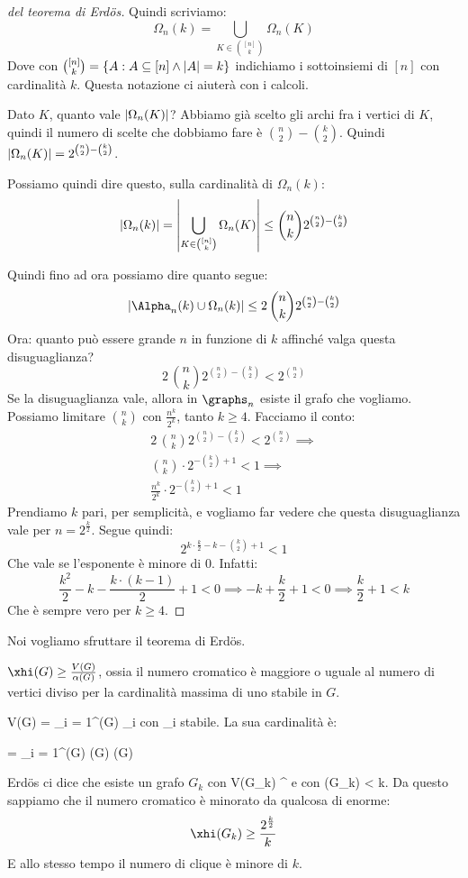 \begin{proof}[del teorema di Erd\"os]
	Quindi scriviamo:
	\[
		\Omega_n (k) = \bigcup_{K \in \binom{[n]}{k}} \Omega_n (K)
	\]
	Dove con $\binom{[n]}{k} = \{ A : A \subseteq [n] \land \left\lvert{A}\right\rvert = k \}$ indichiamo i sottoinsiemi di $[n]$ con cardinalit\`a $k$.
	Questa notazione ci aiuter\`a con i calcoli.

	Dato $K$, quanto vale $\left\lvert{\Omega_n (K)}\right\rvert$?
	Abbiamo gi\`a scelto gli archi fra i vertici di $K$, quindi il numero di scelte che dobbiamo fare \`e $\binom{n}{2} - \binom{k}{2}$.
	Quindi $\left\lvert{\Omega_n (K)}\right\rvert = 2^{\binom{n}{2} - \binom{k}{2}}$.

	Possiamo quindi dire questo, sulla cardinalit\`a di $\Omega_n (k)$:
	\[
		\left\lvert{\Omega_n (k)}\right\rvert = \left\lvert{\bigcup_{K \in \binom{[n]}{k}} \Omega_n (K)}\right\rvert \le
		\binom{n}{k} 2^{\binom{n}{2} - \binom{k}{2}}
	\]

	Quindi fino ad ora possiamo dire quanto segue:
	\[
		\abs{\Alpha_n (k) \cup \Omega_n (k)} \le 2 \, \binom{n}{k} 2^{\binom{n}{2} - \binom{k}{2}}
	\]
	Ora: quanto pu\`o essere grande $n$ in funzione di $k$ affinch\'e valga questa disuguaglianza?
	\[
		2 \, \binom{n}{k} 2^{\binom{n}{2} - \binom{k}{2}} < 2^{\binom{n}{2}}
	\]
	Se la disuguaglianza vale, allora in $\graphs_n$ esiste il grafo che vogliamo.
	Possiamo limitare $\binom{n}{k}$ con $\frac{n^k}{2^k}$, tanto $k \ge 4$.
	Facciamo il conto:
	\begin{align*}
		2 \, \binom{n}{k} 2^{\binom{n}{2} - \binom{k}{2}} < 2^{\binom{n}{2}} \implies \\
		\binom{n}{k} \cdot 2^{- \binom{k}{2} + 1} < 1 \implies \\
		\frac{n^k}{2^k} \cdot 2^{- \binom{k}{2} + 1} < 1
	\end{align*}
	Prendiamo $k$ pari, per semplicit\`a, e vogliamo far vedere che questa disuguaglianza vale per $n = 2^{\frac{k}{2}}$.
	Segue quindi:
	\[
		2^{k \cdot \frac{k}{2} - k - \binom{k}{2} + 1} < 1
	\]
	Che vale se l'esponente \`e minore di $0$.
	Infatti:
	\[
		\frac{k^2}{2} - k - \frac{k \cdot (k - 1)}{2} + 1 < 0 \implies
		- k + \frac{k}{2} + 1 < 0 \implies
		\frac{k}{2} + 1 < k
	\]
	Che \`e sempre vero per $k \ge 4$.
\end{proof}

Noi vogliamo sfruttare il teorema di Erd\"os.
\begin{oss}
	$\xhi (G) \ge \frac{V(G)}{\alpha(G)}$, ossia il numero cromatico \`e maggiore o uguale al numero di vertici diviso per la cardinalit\`a massima di uno stabile in $G$.
\end{oss}

V(G) = \bigcup_{i = 1}^{\xhi(G)} \Alpha_i con \Alpha_i stabile.
La sua cardinalit\`a \`e:

 = \sum_{i = 1}^{\xhi(G)}  \le \xhi(G) \cdot \alpha(G)

Erd\"os ci dice che esiste un grafo $G_k$ con V(G_k) ^{} e con \alpha(G_k) < k.
Da questo sappiamo che il numero cromatico \`e minorato da qualcosa di enorme:
\[
	\xhi(G_k) \ge \frac{2^{\frac{k}{2}}}{k}
\]
E allo stesso tempo il numero di clique \`e minore di $k$.
